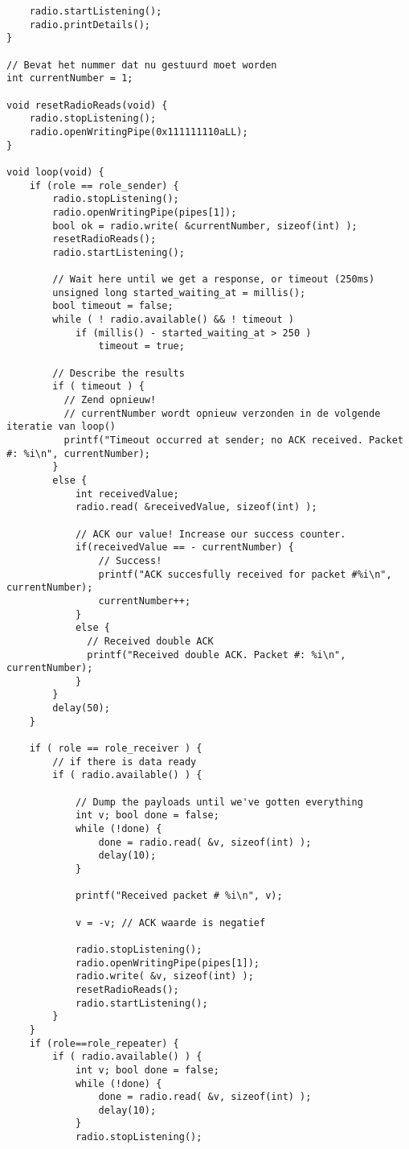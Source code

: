 \begin{lstlisting}
    radio.startListening();
    radio.printDetails();
}

// Bevat het nummer dat nu gestuurd moet worden
int currentNumber = 1;

void resetRadioReads(void) {
    radio.stopListening();
    radio.openWritingPipe(0x111111110aLL);
}

void loop(void) {
    if (role == role_sender) {
        radio.stopListening();
        radio.openWritingPipe(pipes[1]);
        bool ok = radio.write( &currentNumber, sizeof(int) );
        resetRadioReads();
        radio.startListening();

        // Wait here until we get a response, or timeout (250ms)
        unsigned long started_waiting_at = millis();
        bool timeout = false;
        while ( ! radio.available() && ! timeout )
            if (millis() - started_waiting_at > 250 )
                timeout = true;

        // Describe the results
        if ( timeout ) {
          // Zend opnieuw!
          // currentNumber wordt opnieuw verzonden in de volgende iteratie van loop()
          printf("Timeout occurred at sender; no ACK received. Packet #: %i\n", currentNumber);
        }
        else {
            int receivedValue;
            radio.read( &receivedValue, sizeof(int) );

            // ACK our value! Increase our success counter.
            if(receivedValue == - currentNumber) {
                // Success!
                printf("ACK succesfully received for packet #%i\n", currentNumber);
                currentNumber++;
            }
            else {
              // Received double ACK
              printf("Received double ACK. Packet #: %i\n", currentNumber);
            }
        }
        delay(50);
    }

    if ( role == role_receiver ) {
        // if there is data ready
        if ( radio.available() ) {
            
            // Dump the payloads until we've gotten everything
            int v; bool done = false;
            while (!done) {
                done = radio.read( &v, sizeof(int) );
                delay(10);
            }

            printf("Received packet # %i\n", v);

            v = -v; // ACK waarde is negatief

            radio.stopListening();
            radio.openWritingPipe(pipes[1]);
            radio.write( &v, sizeof(int) );
            resetRadioReads();
            radio.startListening();
        }
    }
    if (role==role_repeater) {
        if ( radio.available() ) {
            int v; bool done = false;
            while (!done) {
                done = radio.read( &v, sizeof(int) );
                delay(10);
            }
            radio.stopListening();


\end{lstlisting}
